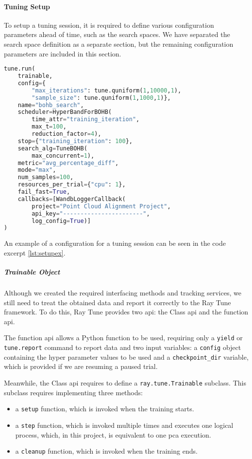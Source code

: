 \paragraph{Tuning Setup}

To setup a tuning session, it is required to define various configuration parameters ahead of time, such as the search spaces. We have separated the search space definition as a separate section, but the remaining configuration parameters are included in this section.

\begin{lstlisting}[language=Python, caption=Tuning session configuration example, captionpos=b, label={lst:setupex}]
tune.run(
    trainable,
    config={
        "max_iterations": tune.quniform(1,10000,1),
        "sample_size": tune.quniform(1,1000,1)},
    name="bohb_search",
    scheduler=HyperBandForBOHB(
        time_attr="training_iteration",
        max_t=100,
        reduction_factor=4),
    stop={"training_iteration": 100},
    search_alg=TuneBOHB(
        max_concurrent=1),
    metric="avg_percentage_diff",
    mode="max",
    num_samples=100,
    resources_per_trial={"cpu": 1},
    fail_fast=True,
    callbacks=[WandbLoggerCallback(
        project="Point Cloud Alignment Project",
        api_key="-----------------------",
        log_config=True)]
)
\end{lstlisting}

An example of a configuration for a tuning session can be seen in the code excerpt \ref{lst:setupex}.

\subparagraph{Trainable Object}

Although we created the required interfacing methods and tracking services, we still need to treat the obtained data and report it correctly to the Ray Tune framework. To do this, Ray Tune provides two \acrshort{api}: the Class \acrshort{api} and the function \acrshort{api}. 

The function \acrshort{api} allows a Python function to be used, requiring only a \verb!yield! or \verb!tune.report! command to report data and two input variables: a \verb!config! object containing the hyper parameter values to be used and a \verb!checkpoint_dir! variable, which is provided if we are resuming a paused trial.

Meanwhile, the Class \acrshort{api} requires to define a \verb!ray.tune.Trainable! subclass. This subclass requires implementing three methods: 

\begin{itemize}
    \item a \verb!setup! function, which is invoked when the training starts.
    \item a \verb!step! function, which is invoked multiple times and executes one logical process, which, in this project, is equivalent to one \acrshort{pca} execution.
    \item a \verb!cleanup! function, which is invoked when the training ends.
\end{itemize}

